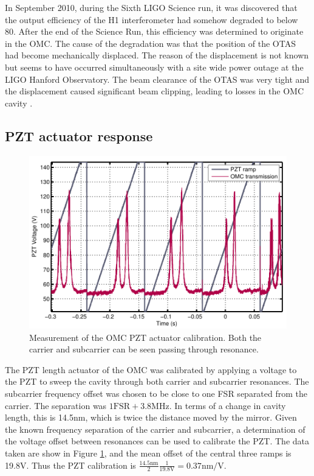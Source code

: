 In September 2010, during the Sixth LIGO Science run, it was discovered that the output efficiency of the H1 interferometer had somehow degraded to below 80\perc{}. %
After the end of the Science Run, this efficiency was determined to originate in the OMC. %
The cause of the degradation was that the position of the OTAS had become mechanically displaced. %
The reason of the displacement is not known but seems to have occurred simultaneously with a site wide power outage at the LIGO Hanford Observatory. %
The beam clearance of the OTAS was very tight and the displacement caused significant beam clipping, leading to losses in the OMC cavity \cite{T1100562}.

\subsection{PZT actuator response}
\begin{figure}[h!]
  \begin{center}
  \leavevmode
  \includegraphics{figs-omc/pztdccal.pdf}
  \end{center}
  \caption[Measurement of the OMC PZT actuator calibration.]{Measurement of the OMC PZT actuator calibration. Both the carrier and subcarrier can be seen passing through resonance.}
  \label{fig:pztsweep}
\end{figure}
The PZT length actuator of the OMC was calibrated by applying a voltage to the PZT to sweep the cavity through both carrier and subcarrier resonances. %
The subcarrier frequency offset was chosen to be close to one FSR separated from the carrier. %
The separation was $1\mathrm{FSR}+3.8$MHz. %
In terms of a change in cavity length, this is 14.5nm, which is twice the distance moved by the mirror. %
Given the known frequency separation of the carrier and subcarrier, a determination of the voltage offset between resonances can be used to calibrate the PZT. %
The data taken are show in Figure \ref{fig:pztsweep}, and the mean offset of the central three ramps is 19.8V. %
Thus the PZT calibration is $\frac{14.5\text{nm}}{2}\frac{1}{19.8\text{V}}=0.37\text{nm}/\text{V}$.


